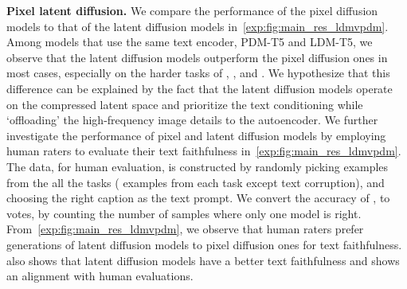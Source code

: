 \par \noindent \textbf{Pixel \vs latent diffusion.}
We compare the \OURS performance of the pixel diffusion models to that of the latent diffusion models in~\cref{exp:fig:main_res_ldmvpdm}.
Among models that use the same text encoder, \ie PDM-T5 and LDM-T5, we observe that the latent diffusion models outperform the pixel diffusion ones in most cases, especially on the harder tasks of , ,  and .
We hypothesize that this difference can be explained by the fact that the latent diffusion models operate on the compressed latent space and prioritize the text conditioning while `offloading' the high-frequency image details to the autoencoder.
We further investigate the performance of pixel and latent diffusion models by employing human raters to evaluate their text faithfulness in~\cref{exp:fig:main_res_ldmvpdm}.
The data, for human evaluation, is constructed by randomly picking  examples from the all the tasks ( examples from each task except text corruption), and choosing the right caption as the text prompt.
We convert the accuracy of \OURS, to votes, by counting the number of samples where only one model is right.
From~\cref{exp:fig:main_res_ldmvpdm}, we observe that human raters prefer generations of latent diffusion models to pixel diffusion ones for text faithfulness. \OURS also shows that latent diffusion models have a better text faithfulness and shows an alignment with human evaluations.




